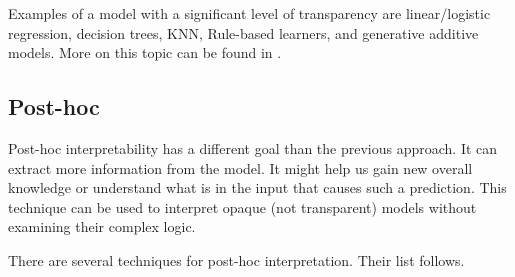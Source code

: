Examples of a model with a significant level of transparency are linear/logistic regression, decision trees, KNN, Rule-based learners, and generative additive models. More on this topic can be found in \cite{Arrieta2019}.

\subsection{Post-hoc}
Post-hoc interpretability has a different goal than the previous approach. It can extract more information from the model. It might help us gain new overall knowledge or understand what is in the input that causes such a prediction. This technique can be used to interpret opaque (not transparent) models without examining their complex logic.

There are several techniques for post-hoc interpretation. Their list follows.

